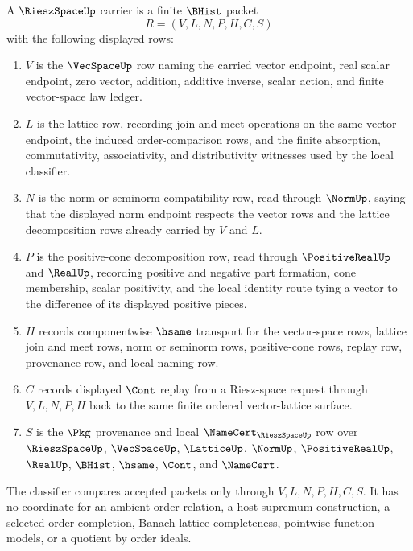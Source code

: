 \begin{definition}
\label{def:riesz-space-carrier}
A $\RieszSpaceUp$ carrier is a finite $\BHist$ packet
$$
R=(V,L,N,P,H,C,S)
$$
with the following displayed rows:
\begin{enumerate}
\item $V$ is the $\VecSpaceUp$ row naming the carried vector endpoint, real scalar endpoint, zero vector, addition, additive inverse, scalar action, and finite vector-space law ledger.
\item $L$ is the lattice row, recording join and meet operations on the same vector endpoint, the induced order-comparison rows, and the finite absorption, commutativity, associativity, and distributivity witnesses used by the local classifier.
\item $N$ is the norm or seminorm compatibility row, read through $\NormUp$, saying that the displayed norm endpoint respects the vector rows and the lattice decomposition rows already carried by $V$ and $L$.
\item $P$ is the positive-cone decomposition row, read through $\PositiveRealUp$ and $\RealUp$, recording positive and negative part formation, cone membership, scalar positivity, and the local identity route tying a vector to the difference of its displayed positive pieces.
\item $H$ records componentwise $\hsame$ transport for the vector-space rows, lattice join and meet rows, norm or seminorm rows, positive-cone rows, replay row, provenance row, and local naming row.
\item $C$ records displayed $\Cont$ replay from a Riesz-space request through $V,L,N,P,H$ back to the same finite ordered vector-lattice surface.
\item $S$ is the $\Pkg$ provenance and local $\NameCert_{\RieszSpaceUp}$ row over $\RieszSpaceUp$, $\VecSpaceUp$, $\LatticeUp$, $\NormUp$, $\PositiveRealUp$, $\RealUp$, $\BHist$, $\hsame$, $\Cont$, and $\NameCert$.
\end{enumerate}
The classifier compares accepted packets only through $V,L,N,P,H,C,S$. It has no coordinate for an ambient order relation, a host supremum construction, a selected order completion, Banach-lattice completeness, pointwise function models, or a quotient by order ideals.
\end{definition}

